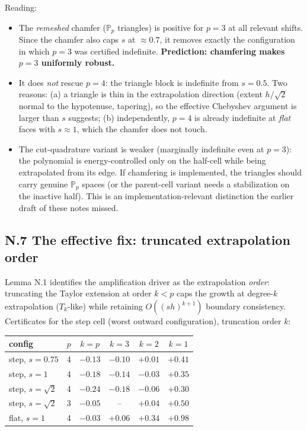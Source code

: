 Reading:
\begin{itemize}
  \item The \emph{remeshed} chamfer ($\mathbb P_p$ triangles) is positive
        for $p=3$ at all relevant shifts. Since the chamfer also caps $s$
        at $\approx 0.7$, it removes exactly the configuration in which
        $p=3$ was certified indefinite. \textbf{Prediction: chamfering
        makes $p=3$ uniformly robust.}
  \item It does \emph{not} rescue $p=4$: the triangle block is indefinite
        from $s = 0.5$. Two reasons: (a) a triangle is thin in the
        extrapolation direction (extent $h/\sqrt2$ normal to the
        hypotenuse, tapering), so the effective Chebyshev argument is
        larger than $s$ suggests; (b) independently, $p=4$ is already
        indefinite at \emph{flat} faces with $s \approx 1$, which the
        chamfer does not touch.
  \item The cut-quadrature variant is weaker (marginally indefinite even
        at $p=3$): the polynomial is energy-controlled only on the
        half-cell while being extrapolated from its edge. If chamfering is
        implemented, the triangles should carry genuine $\mathbb P_p$
        spaces (or the parent-cell variant needs a stabilization on the
        inactive half). This is an implementation-relevant distinction the
        earlier draft of these notes missed.
\end{itemize}

\subsection*{N.7 The effective fix: truncated extrapolation order}

Lemma N.1 identifies the amplification driver as the extrapolation
\emph{order}: truncating the Taylor extension at order $k < p$ caps the
growth at degree-$k$ extrapolation ($T_k$-like) while retaining
$O((sh)^{k+1})$ boundary consistency. Certificates for the step cell
(worst outward configuration), truncation order $k$:

\begin{center}
\begin{tabular}{llcccc}
\hline
config & $p$ & $k=p$ & $k=3$ & $k=2$ & $k=1$ \\
\hline
step, $s=0.75$   & 4 & $-0.13$ & $-0.10$ & $\mathbf{+0.01}$ & $+0.41$ \\
step, $s=1$      & 4 & $-0.18$ & $-0.14$ & $-0.03$ & $+0.35$ \\
step, $s=\sqrt2$ & 4 & $-0.24$ & $-0.18$ & $-0.06$ & $+0.30$ \\
step, $s=\sqrt2$ & 3 & $-0.05$ & --      & $\mathbf{+0.04}$ & $+0.50$ \\
flat, $s=1$      & 4 & $-0.03$ & $+0.06$ & $+0.34$ & $+0.98$ \\
\hline
\end{tabular}
\end{center}

